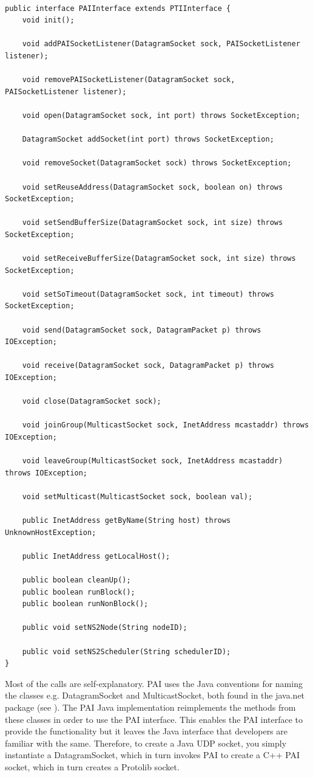 \footnotesize
\begin{verbatim}

public interface PAIInterface extends PTIInterface {
    void init();
    
    void addPAISocketListener(DatagramSocket sock, PAISocketListener listener);

    void removePAISocketListener(DatagramSocket sock, PAISocketListener listener);

    void open(DatagramSocket sock, int port) throws SocketException;

    DatagramSocket addSocket(int port) throws SocketException;

    void removeSocket(DatagramSocket sock) throws SocketException;

    void setReuseAddress(DatagramSocket sock, boolean on) throws SocketException;

    void setSendBufferSize(DatagramSocket sock, int size) throws SocketException;

    void setReceiveBufferSize(DatagramSocket sock, int size) throws SocketException;

    void setSoTimeout(DatagramSocket sock, int timeout) throws SocketException;

    void send(DatagramSocket sock, DatagramPacket p) throws IOException;

    void receive(DatagramSocket sock, DatagramPacket p) throws IOException;

    void close(DatagramSocket sock);

    void joinGroup(MulticastSocket sock, InetAddress mcastaddr) throws IOException;

    void leaveGroup(MulticastSocket sock, InetAddress mcastaddr) throws IOException;

    void setMulticast(MulticastSocket sock, boolean val);

    public InetAddress getByName(String host) throws UnknownHostException;

    public InetAddress getLocalHost();

    public boolean cleanUp();
    public boolean runBlock();
    public boolean runNonBlock();

    public void setNS2Node(String nodeID);

    public void setNS2Scheduler(String schedulerID);
}
\end{verbatim}
\normalsize
  
Most of the calls are self-explanatory.  PAI uses the Java conventions
for naming the classes e.g. DatagramSocket and MulticastSocket, both found
in the java.net package (see \cite{javaTutorial}). The PAI Java 
implementation reimplements the methods from these classes in order
to use the PAI interface.  This enables the PAI interface to provide the 
functionality but it leaves the Java interface that developers are familiar
with the same. Therefore, to create a Java UDP socket, you simply
instantiate a DatagramSocket, which in turn invokes PAI to create
a C++ PAI socket, which in turn creates a Protolib socket.   

